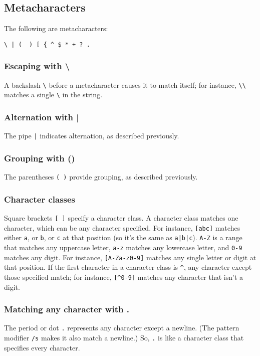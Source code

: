 \subsection{Metacharacters}
The following are metacharacters:

\begin{lstlisting}
\ | (  ) [ { ^ $ * + ? .
\end{lstlisting}

\subsubsection{Escaping with \textbackslash}
A backslash \verb|\| before a metacharacter causes it to match itself; for instance, \verb|\\| matches a single \verb|\| in the string.

\subsubsection{Alternation with |}
The pipe \verb=|= indicates alternation, as described previously.

\subsubsection{Grouping with ()}
The parentheses \verb|( )| provide grouping, as described previously.

\subsubsection{Character classes}
Square brackets \verb|[ ]| specify a character class. A character class matches one character, which can be any character specified. For instance, \verb|[abc]| matches either \verb|a|, or \verb|b|, or \verb|c| at that position (so it's the same as \verb=a|b|c=). \verb|A-Z| is a range that matches any uppercase letter, \verb|a-z| matches any lowercase letter, and \verb|0-9| matches any digit. For instance, \verb|[A-Za-z0-9]| matches any single letter or digit at that position. If the first character in a character class is \verb|^|, any character except those specified match; for instance, \verb|[^0-9]| matches any character that isn't a digit.

\subsubsection{Matching any character with .}
The period or dot \verb|.| represents any character except a newline.  (The pattern modifier \verb|/s| makes it also match a newline.) So, \verb|.| is like a character class that specifies every character.

